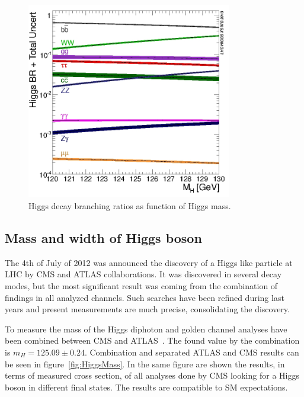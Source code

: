 \begin{figure}[!Hhtbp]
  \begin{center}
    \includegraphics[width=0.8\textwidth]{figs/Higgs_BR_120-130.jpg}
    \caption{Higgs decay branching ratios as function of Higgs mass.}
    \label{fig:HiggsBrs}
  \end{center}
\end{figure}

\subsection{Mass and width of Higgs boson}

The 4th of July of 2012 was announced the discovery of a Higgs like particle at LHC by CMS and ATLAS collaborations. It was discovered in several decay modes, but the most significant result was coming from the combination of findings in all analyzed channels. Such searches have been refined during last years and present measurements are much precise, consolidating the discovery. 

To measure the mass of the Higgs diphoton and golden channel analyses have been combined between CMS and ATLAS~\cite{Aad:2015zhl}. The found value by the combination is $m_{H}=125.09\pm 0.24$. Combination and separated ATLAS and CMS results can be seen in figure~\ref{fig:HiggsMass}. In the same figure are shown the results, in terms of measured cross section, of all analyses done by CMS looking for a Higgs boson in different final states. The results are compatible to SM expectations.

